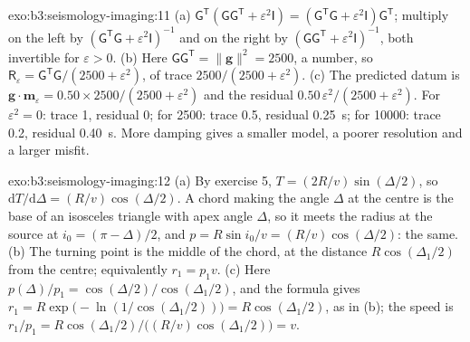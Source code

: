 \begin{solution}{exo:b3:seismology-imaging:11}
(a) $\mathsf G^{\mathsf T}(\mathsf G\mathsf G^{\mathsf T} + \varepsilon^2\mathsf I)
= (\mathsf G^{\mathsf T}\mathsf G + \varepsilon^2\mathsf I)\mathsf G^{\mathsf T}$;
multiply on the left by $(\mathsf G^{\mathsf T}\mathsf G + \varepsilon^2
\mathsf I)^{-1}$ and on the right by $(\mathsf G\mathsf G^{\mathsf T} +
\varepsilon^2\mathsf I)^{-1}$, both invertible for $\varepsilon > 0$.
(b) Here $\mathsf G\mathsf G^{\mathsf T} = \|\mathbf g\|^2 = 2500$, a number,
so $\mathsf R_\varepsilon = \mathsf G^{\mathsf T}\mathsf G/(2500 + \varepsilon^2)$,
of trace $2500/(2500 + \varepsilon^2)$. (c) The predicted datum is
$\mathbf g\cdot\mathbf m_\varepsilon = 0.50\times2500/(2500 + \varepsilon^2)$
and the residual $0.50\,\varepsilon^2/(2500 + \varepsilon^2)$. For
$\varepsilon^2 = 0$: trace 1, residual 0; for 2500: trace 0.5, residual
\qty{0.25}{s}; for \num{10000}: trace 0.2, residual \qty{0.40}{s}. More damping
gives a smaller model, a poorer resolution and a larger misfit.
\end{solution}

\begin{solution}{exo:b3:seismology-imaging:12}
(a) By exercise 5, $T = (2R/v)\sin(\Delta/2)$, so $\mathrm dT/\mathrm d\Delta
= (R/v)\cos(\Delta/2)$. A chord making the angle $\Delta$ at the centre is the
base of an isosceles triangle with apex angle $\Delta$, so it meets the radius
at the source at $i_0 = (\pi - \Delta)/2$, and $p = R\sin i_0/v =
(R/v)\cos(\Delta/2)$: the same. (b) The turning point is the middle of the
chord, at the distance $R\cos(\Delta_1/2)$ from the centre; equivalently
$r_1 = p_1v$. (c) Here $p(\Delta)/p_1 = \cos(\Delta/2)/\cos(\Delta_1/2)$, and
the formula gives $r_1 = R\exp\bigl(-\ln(1/\cos(\Delta_1/2))\bigr) =
R\cos(\Delta_1/2)$, as in (b); the speed is $r_1/p_1 = R\cos(\Delta_1/2)\big/
\bigl((R/v)\cos(\Delta_1/2)\bigr) = v$.
\end{solution}

